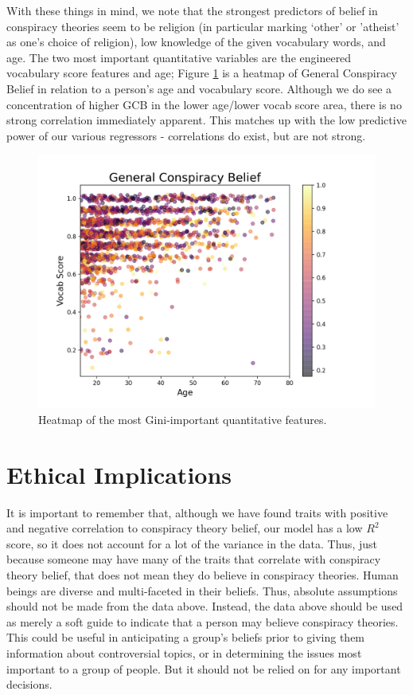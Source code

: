 \documentclass[11pt]{article}
\begin{document}
With these things in mind, we note that the strongest predictors of belief in conspiracy theories seem to be religion (in particular marking ‘other’ or 'atheist' as one’s choice of religion), low knowledge of the given vocabulary words, and age. The two most important quantitative variables are the engineered vocabulary score features and age; Figure \ref{fig:heat} is a heatmap of General Conspiracy Belief in relation to a person’s age and vocabulary score. Although we do see a concentration of higher GCB in the lower age/lower vocab score area, there is no strong correlation immediately apparent. This matches up with the low predictive power of our various regressors - correlations do exist, but are not strong.
\begin{figure}[ht]
	\centering
\includegraphics[scale=1.2]{"../VocabAge_GCB.png"}
	\vspace{-14mm}
	\caption{Heatmap of the most Gini-important quantitative features.}
	\label{fig:heat}
\end{figure}
    \hypertarget{ethical-implications}{%
\section*{Ethical Implications}\label{ethical-implications}}

It is important to remember that, although we have found traits with
positive and negative correlation to conspiracy theory belief, our model
has a low $R^2$ score, so it does not account
for a lot of the variance in the data. Thus, just because someone may
have many of the traits that correlate with conspiracy theory belief,
that does not mean they do believe in conspiracy theories. Human beings
are diverse and multi-faceted in their beliefs. Thus, absolute
assumptions should not be made from the data above. Instead, the data
above should be used as merely a soft guide to indicate that a person
may believe conspiracy theories. This could be useful in anticipating a
group's beliefs prior to giving them information about controversial
topics, or in determining the issues most important to a group of
people. But it should not be relied on for any important decisions.
\end{document}
